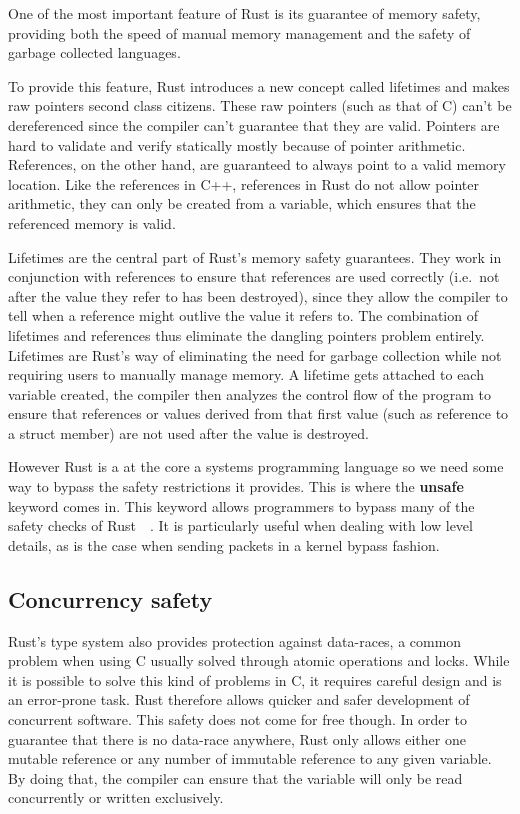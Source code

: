 One of the most important feature of Rust is its guarantee of memory
safety, providing both the speed of manual memory management and the
safety of garbage collected languages.

To provide this feature, Rust introduces a new concept called
lifetimes and makes raw pointers second class citizens. These raw
pointers (such as that of C) can't be dereferenced since the compiler
can't guarantee that they are valid. Pointers are hard to validate and
verify statically mostly because of pointer arithmetic. References, on
the other hand, are guaranteed to always point to a valid memory
location. Like the references in C++, references in Rust do not allow
pointer arithmetic, they can only be created from a variable, which
ensures that the referenced memory is valid.

Lifetimes are the central part of Rust's memory safety
guarantees. They work in conjunction with references to ensure
that references are used correctly (i.e.\ not after the value they
refer to has been destroyed), since they allow the compiler to tell
when a reference might outlive the value it refers to. The combination
of lifetimes and references thus eliminate the dangling pointers
problem entirely. Lifetimes are Rust's way of eliminating the need for
garbage collection while not requiring users to manually manage
memory. A lifetime gets attached to each variable created, the
compiler then analyzes the control flow of the program to ensure that
references or values derived from that first value (such as reference
to a struct member) are not used after the value is destroyed.

However Rust is a at the core a systems programming language so we
need some way to bypass the safety restrictions it provides. This is
where the \textbf{unsafe}~\cite{rustonomicon} keyword comes in. This
keyword allows programmers to bypass many of the safety checks of
Rust~\cite{rust-os}~\cite{redox}. It is particularly useful when
dealing with low level details, as is the case when sending packets in
a kernel bypass fashion.

\subsection{Concurrency safety}

Rust's type system also provides protection against data-races, a
common problem when using C usually solved through atomic operations
and locks. While it is possible to solve this kind of problems in C,
it requires careful design and is an error-prone task. Rust therefore
allows quicker and safer development of concurrent software. This safety
does not come for free though. In order to guarantee that there is no
data-race anywhere, Rust only allows either one mutable reference or
any number of immutable reference to any given variable. By doing
that, the compiler can ensure that the variable will only be read
concurrently or written exclusively.

